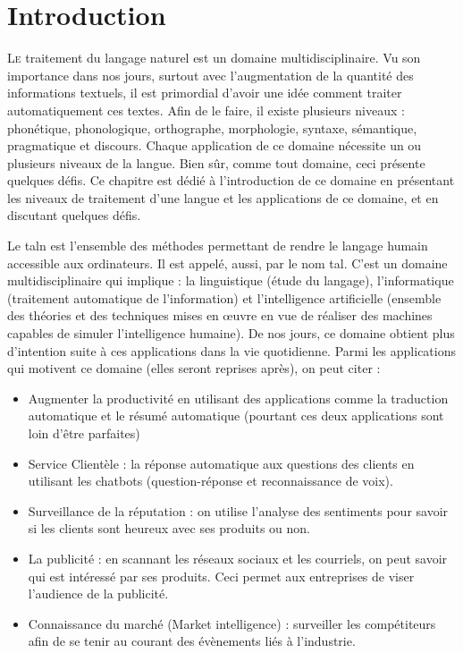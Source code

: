 \documentclass{KodeBook}
\begin{document}
		\mainmatter
	
\fi
\chapter{Introduction}

\begin{introduction}
	\lettrine{L}{e} traitement du langage naturel est un domaine multidisciplinaire. 
	Vu son importance dans nos jours, surtout avec l'augmentation de la quantité des informations textuels, il est primordial d'avoir une idée comment traiter automatiquement ces textes. 
	Afin de le faire, il existe plusieurs niveaux : phonétique, phonologique, orthographe, morphologie, syntaxe, sémantique, pragmatique et discours. 
	Chaque application de ce domaine nécessite un ou plusieurs niveaux de la langue. 
	Bien sûr, comme tout domaine, ceci présente quelques défis. 
	Ce chapitre est dédié à l'introduction de ce domaine en présentant les niveaux de traitement d'une langue et les applications de ce domaine, et en discutant quelques défis.
\end{introduction} 

Le \ac{taln} est l'ensemble des méthodes permettant de rendre le langage humain accessible aux ordinateurs.
Il est appelé, aussi, par le nom \ac{tal}. 
C'est un domaine multidisciplinaire qui implique : la linguistique (étude du langage), l'informatique (traitement automatique de l'information) et l'intelligence artificielle (ensemble des théories et des techniques mises en œuvre en vue de réaliser des machines capables de simuler l'intelligence humaine).
De nos jours, ce domaine obtient plus d'intention suite à ces applications dans la vie quotidienne. 
Parmi les applications qui motivent ce domaine (elles seront reprises après), on peut citer :
\begin{itemize}
	\item Augmenter la productivité en utilisant des applications comme la traduction automatique et le résumé automatique (pourtant ces deux applications sont loin d'être parfaites)
	
	\item Service Clientèle : la réponse automatique aux questions des clients en utilisant les chatbots (question-réponse et reconnaissance de voix). 
	
	\item Surveillance de la réputation : on utilise l'analyse des sentiments pour savoir si les clients sont heureux avec ses produits ou non. 
	
	\item La publicité : en scannant les réseaux sociaux et les courriels, on peut savoir qui est intéressé par ses produits. Ceci permet aux entreprises de viser l'audience de la publicité. 
	
	\item Connaissance du marché (Market intelligence) : surveiller les compétiteurs afin de se tenir au courant des évènements liés à l'industrie.
\end{itemize}
\end{document}

